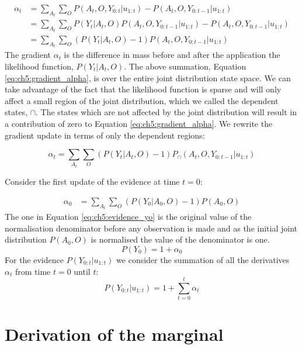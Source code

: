\begin{appendices}
\begin{align}
 \alpha_t  &= \sum\limits_{A_t}\sum\limits_{O} P(A_t,O,Y_{0:t}|u_{1:t}) - P(A_t,O,Y_{0:t-1}|u_{1:t})  \\
	   &= \sum\limits_{A_t}\sum\limits_{O} P(Y_t|A_t,O)P(A_t,O,Y_{0:t-1}|u_{1:t}) - P(A_t,O,Y_{0:t-1}|u_{1:t}) \\
	   &= \sum\limits_{A_t}\sum\limits_{O} (P(Y_t|A_t,O) - 1)P(A_t,O,Y_{0:t-1}|u_{1:t}) \label{eq:ch5:gradient_alpha}
\end{align}
The gradient $\alpha_t$ is the difference in mass before and after the application the likelihood function, $P(Y_t|A_t,O)$. The above 
summation, Equation \ref{eq:ch5:gradient_alpha}, is over the entire joint distribution state space. We can take advantage of the fact 
that the likelihood function is sparse and will only affect a small region of the joint distribution, which we called the dependent states, $\cap$.
The states which are not affected by the joint distribution will result in a contribution of zero to Equation \ref{eq:ch5:gradient_alpha}. We 
rewrite the gradient update in terms of only the dependent regions:

\begin{equation}
 \alpha_t = \sum\limits_{A_t}\sum\limits_{O} (P(Y_t|A_t,O) - 1)P_{\cap}(A_t,O,Y_{0:t-1}|u_{1:t})
\end{equation}

Consider the first update of the evidence at time $t=0$:

\begin{align}
 \alpha_0 &= \sum\limits_{A_t}\sum\limits_{O} (P(Y_0|A_0,O) - 1)P(A_0,O) 
\end{align}
The one in Equation \ref{eq:ch5:evidence_yo} is the original value of the normalisation denominator before any observation is made and as the 
initial joint distribution $P(A_0,O)$ is normalised the value of the denominator is one.
\begin{equation}
 P(Y_0) = 1 + \alpha_0 \label{eq:ch5:evidence_yo}
\end{equation}
For the evidence $P(Y_{0:t}|u_{1:t})$ we consider the summation of all the derivatives $\alpha_t$ from time $t=0$ until $t$:
\begin{equation}
 P(Y_{0:t}|u_{1:t}) = 1 + \sum_{t=0}^t \alpha_t \label{eq:ch5:evidence_y}
\end{equation}


\section{Derivation of the marginal}\label{appendix:marginal}


\end{appendices}
